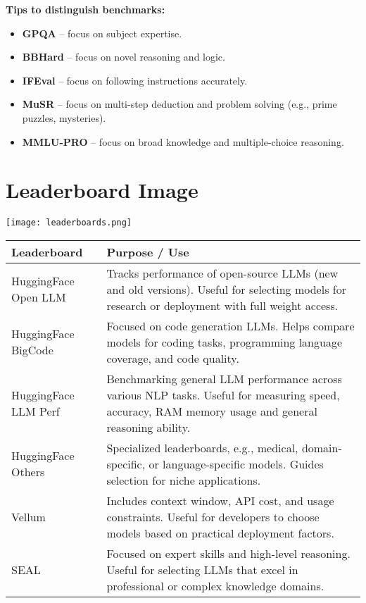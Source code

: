 \documentclass[a4paper, 12pt]{article}
\begin{document}
\vspace{0.5em}
\textbf{Tips to distinguish benchmarks:}
\begin{itemize}
    \item \textbf{GPQA} -- focus on subject expertise.
    \item \textbf{BBHard} -- focus on novel reasoning and logic.
    \item \textbf{IFEval} -- focus on following instructions accurately.
    \item \textbf{MuSR} -- focus on multi-step deduction and problem solving (e.g., prime puzzles, mysteries).
    \item \textbf{MMLU-PRO} -- focus on broad knowledge and multiple-choice reasoning.
\end{itemize}


\section*{Leaderboard Image}

\begin{center}
\texttt{[image: leaderboards.png]}
\end{center}

\begin{tabularx}{\textwidth}{|>{\hsize}L|>{\hsize}L|}
\hline
\textbf{Leaderboard} & \textbf{Purpose / Use} \\
\hline
HuggingFace Open LLM & Tracks performance of open-source LLMs (new and old versions). Useful for selecting models for research or deployment with full weight access. \\
\hline
HuggingFace BigCode & Focused on code generation LLMs. Helps compare models for coding tasks, programming language coverage, and code quality. \\
\hline
HuggingFace LLM Perf & Benchmarking general LLM performance across various NLP tasks. Useful for measuring speed, accuracy, RAM memory usage and general reasoning ability. \\
\hline
HuggingFace Others & Specialized leaderboards, e.g., medical, domain-specific, or language-specific models. Guides selection for niche applications. \\
\hline
Vellum & Includes context window, API cost, and usage constraints. Useful for developers to choose models based on practical deployment factors. \\
\hline
SEAL & Focused on expert skills and high-level reasoning. Useful for selecting LLMs that excel in professional or complex knowledge domains. \\
\hline
\end{tabularx}
\end{document}
